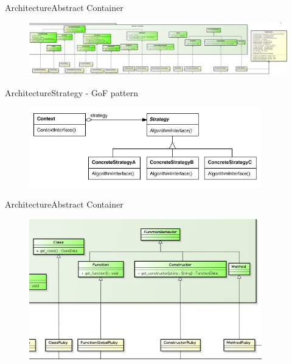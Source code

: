 \documentclass[10pt]{beamer}
\begin{document}
\begin{frame}{Architecture}{Abstract Container}
  \begin{figure}[overview]
    \includegraphics[width=1\textwidth]{images/abstractContainer.png}
  \end{figure}
\end{frame}

\begin{frame}{Architecture}{Strategy - GoF pattern}
  \begin{figure}[stategof]
    \includegraphics[width=0.9\textwidth]{images/strategy.png}
  \end{figure}
\end{frame}

\begin{frame}{Architecture}{Abstract Container}
  \begin{figure}[overview]
    \includegraphics[width=0.9\textwidth]{images/abstractContainerClasses.png}
  \end{figure}
\end{frame}
\end{document}

